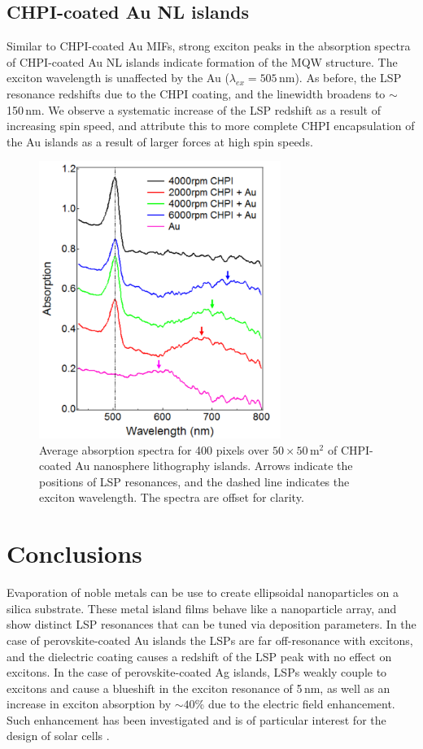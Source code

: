 \subsection{CHPI-coated Au NL islands}
Similar to CHPI-coated Au MIFs, strong exciton peaks in the absorption spectra of CHPI-coated Au NL islands indicate formation of the MQW structure. The exciton wavelength is unaffected by the Au ($\lambda_{ex} = 505$\,nm). As before, the LSP resonance redshifts due to the CHPI coating, and the linewidth broadens to $\sim$150\,nm. We observe a systematic increase of the LSP redshift as a result of increasing spin speed, and attribute this to more complete CHPI encapsulation of the Au islands as a result of larger forces at high spin speeds.
\begin{figure}[h!] 
\centering    
\includegraphics[width=0.7\textwidth]{Fig10}
\caption{Average absorption spectra for 400 pixels over $50\times50\,$\textmu m$^2$ of CHPI-coated Au nanosphere lithography islands. Arrows indicate the positions of LSP resonances, and the dashed line indicates the exciton wavelength. The spectra are offset for clarity.}
\label{6Fig10}
\end{figure}

\section{Conclusions}
Evaporation of noble metals can be use to create ellipsoidal nanoparticles on a silica substrate. These metal island films behave like a nanoparticle array, and show distinct LSP resonances that can be tuned via deposition parameters. In the case of perovskite-coated Au islands the LSPs are far off-resonance with excitons, and the dielectric coating causes a redshift of the LSP peak with no effect on excitons. In the case of perovskite-coated Ag islands, LSPs weakly couple to excitons and cause a blueshift in the exciton resonance of 5\,nm, as well as an increase in exciton absorption by $\sim40$\% due to the electric field enhancement. Such enhancement has been investigated and is of particular interest for the design of solar cells \cite{Alemu2014, Zheng2011, Xu2013, Spinelli2012}.

